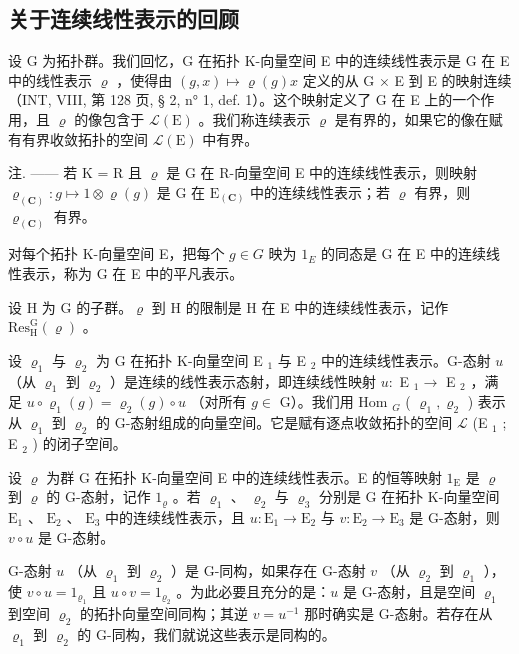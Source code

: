\subsection{关于连续线性表示的回顾}

设 G 为拓扑群。我们回忆，G 在拓扑 K-向量空间 E 中的连续线性表示是 G 在 E 中的线性表示 \(\varrho\) ，使得由 \((g, x) \mapsto \varrho(g)x\) 定义的从 G × E 到 E 的映射连续（INT, VIII, 第 128 页, § 2, n° 1, def. 1）。这个映射定义了 G 在 E 上的一个作用，且 \(\varrho\) 的像包含于 \(\mathcal{L}(\mathrm{E})\) 。我们称连续表示 \(\varrho\) 是有界的，如果它的像在赋有有界收敛拓扑的空间 \(\mathcal{L}(\mathrm{E})\) 中有界。

注. —— 若 K = R 且 \(\varrho\) 是 G 在 R-向量空间 E 中的连续线性表示，则映射 \(\varrho_{(\mathbf{C})}: g \mapsto 1 \otimes \varrho(g)\) 是 G 在 \(\mathrm{E}_{(\mathbf{C})}\) 中的连续线性表示；若 \(\varrho\) 有界，则 \(\varrho_{(\mathbf{C})}\) 有界。

对每个拓扑 K-向量空间 E，把每个 \(g \in G\) 映为 \(1_{E}\) 的同态是 G 在 E 中的连续线性表示，称为 G 在 E 中的平凡表示。

设 H 为 G 的子群。\(\varrho\) 到 H 的限制是 H 在 E 中的连续线性表示，记作 \(\mathrm{Res}_{\mathrm{H}}^{\mathrm{G}}(\varrho)\) 。

设 \(\varrho_{1}\) 与 \(\varrho_{2}\) 为 G 在拓扑 K-向量空间 E \(_{1}\) 与 E \(_{2}\) 中的连续线性表示。G-态射 \(u\) （从 \(\varrho_{1}\) 到 \(\varrho_{2}\) ）是连续的线性表示态射，即连续线性映射 \(u\colon\) E \(_{1} \to\) E \(_{2}\) ，满足 \(u \circ \varrho_{1}(g) = \varrho_{2}(g) \circ u\) （对所有 \(g \in\) G）。我们用 Hom \(_{G}\) ( \(\varrho_{1}, \varrho_{2}\) ) 表示从 \(\varrho_{1}\) 到 \(\varrho_{2}\) 的 G-态射组成的向量空间。它是赋有逐点收敛拓扑的空间 \(\mathcal{L}\) (E \(_{1}\) ; E \(_{2}\) ) 的闭子空间。

设 \(\varrho\) 为群 G 在拓扑 K-向量空间 E 中的连续线性表示。E 的恒等映射 \(1_{\mathrm{E}}\) 是 \(\varrho\) 到 \(\varrho\) 的 G-态射，记作 \(1_{\varrho}\) 。若 \(\varrho_1\) 、 \(\varrho_2\) 与 \(\varrho_3\) 分别是 G 在拓扑 K-向量空间 \(\mathrm{E}_1\) 、 \(\mathrm{E}_2\) 、 \(\mathrm{E}_3\) 中的连续线性表示，且 \(u: \mathrm{E}_1 \to \mathrm{E}_2\) 与 \(v: \mathrm{E}_2 \to \mathrm{E}_3\) 是 G-态射，则 \(v \circ u\) 是 G-态射。

G-态射 \(u\) （从 \(\varrho_{1}\) 到 \(\varrho_{2}\) ）是 G-同构，如果存在 G-态射 \(v\) （从 \(\varrho_{2}\) 到 \(\varrho_{1}\) ），使 \(v\circ u=1_{\varrho_{1}}\) 且 \(u\circ v=1_{\varrho_{2}}\) 。为此必要且充分的是：\(u\) 是 G-态射，且是空间 \(\varrho_{1}\) 到空间 \(\varrho_{2}\) 的拓扑向量空间同构；其逆 \(v=u^{-1}\) 那时确实是 G-态射。若存在从 \(\varrho_{1}\) 到 \(\varrho_{2}\) 的 G-同构，我们就说这些表示是同构的。

